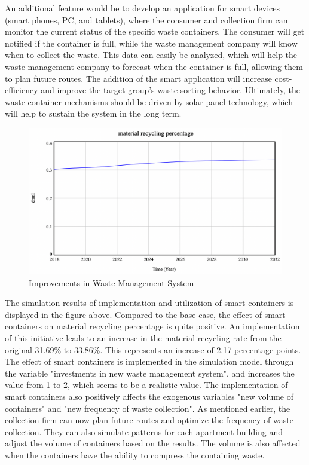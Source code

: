 \indent \newline
An additional feature would be to develop an application for smart devices (smart phones, PC, and tablets), where the consumer and collection firm can monitor the current status of the specific waste containers. The consumer will get notified if the container is full, while the waste management company will know when to collect the waste. This data can easily be analyzed, which will help the waste management company to forecast when the container is full, allowing them to plan future routes. The addition of the smart application will increase cost-efficiency and improve the target group's waste sorting behavior. Ultimately, the waste container mechanisms should be driven by solar panel technology, which will help to sustain the system in the long term. 

\begin{figure}[H]
\centering
\includegraphics [scale=0.28,angle=360]{figures/improvementsinitiative.png}
\caption{Improvements in Waste Management System}
\label{fig:improvementsinitiative}
\end{figure}

\indent \newline
The simulation results of implementation and utilization of smart containers is displayed in the figure above. Compared to the base case, the effect of smart containers on material recycling percentage is quite positive. An implementation of this initiative leads to an increase in the material recycling rate from the original 31.69\% to 33.86\%. This represents an increase of 2.17 percentage points. The effect of smart containers is implemented in the simulation model through the variable "investments in new waste management system", and increases the value from 1 to 2, which seems to be a realistic value. The implementation of smart containers also positively affects the exogenous variables "new volume of containers" and "new frequency of waste collection". As mentioned earlier, the collection firm can now plan future routes and optimize the frequency of waste collection. They can also simulate patterns for each apartment building and adjust the volume of containers based on the results. The volume is also affected when the containers have the ability to compress the containing waste. 

